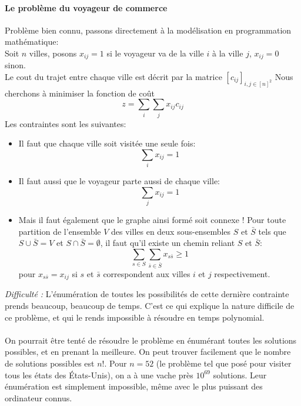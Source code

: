 \documentclass[a4paper]{report}
\begin{document}
\paragraph{Le problème du voyageur de commerce} Problème bien connu, passons
directement à la modélisation en programmation mathématique:\\
Soit \(n\) villes, posons \(x_{ij} = 1\) si le voyageur va de la ville \(i\) à
la ville \(j\), \(x_{ij} = 0\) sinon.\\
Le cout du trajet entre chaque ville est décrit par la matrice
\([c_{ij}]_{i,j\in[n]^2}\)
Nous cherchons à minimiser la fonction de coût
\[z=\sum_i\sum_j x_{ij}c_{ij}\]
Les contraintes sont les suivantes:
\begin{itemize}
	\item Il faut que chaque ville soit visitée une seule fois:
		\[\sum_i x_{ij} = 1\]
	\item Il faut aussi que le voyageur parte aussi de chaque ville:
		\[\sum_j x_{ij} = 1\]
	\item Mais il faut également que le graphe ainsi formé soit connexe ! Pour
		toute partition de l'ensemble \(V\) des villes en deux sous-ensembles
		\(S\) et \(\bar S\) tels que \(S\cup\bar S=V\) et
		\(S\cap\bar S=\emptyset\), il faut qu'il existe un chemin reliant \(S\)
		et \(\bar S\):
		\[\sum_{s\in S}\sum_{\bar s\in\bar S}x_{s\bar s}\ge 1\]
		pour \(x_{s\bar s}=x_{ij}\) si \(s\) et \(\bar s\) correspondent aux
		villes \(i\) et \(j\) respectivement.\\
\end{itemize}
\emph{Difficulté :} L'énumération de toutes les possibilités de cette dernière
contrainte prends beaucoup, beaucoup de temps. C'est ce qui explique la nature
difficile de ce problème, et qui le rends impossible à résoudre en temps
polynomial.

\paragraph{}On pourrait être tenté de résoudre le problème en énumérant toutes
les solutions possibles, et en prenant la meilleure. On peut trouver facilement
que le nombre de solutions possibles est \(n!\). Pour \(n=52\) (le problème
tel que posé pour visiter tous les états des États-Unis), on a à une vache près
\(10^{69}\) solutions. Leur énumération est simplement impossible, même avec le
plus puissant des ordinateur connus.
\end{document}
